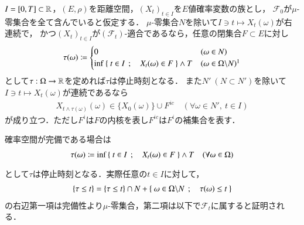	\begin{screen}
		\begin{thm}[閉集合と停止時刻]
			$I = [0,T] \subset \mathbb{R}$，$(E,\rho)$を距離空間，$(X_t)_{t \in I}$を$E$値確率変数の族とし，
			$\mathcal{F}_0$が$\mu$-零集合を全て含んでいると仮定する．
			$\mu$-零集合$N$を除いて$I \ni t \longmapsto X_t(\omega)$が右連続で，
			かつ$(X_t)_{t \in I}$が$(\mathcal{F}_t)$-適合であるなら，任意の閉集合$F \subset E$に対し
			\begin{align}
				\tau(\omega) \coloneqq
				\begin{cases}
					0 & (\omega \in N) \\
					\inf{}{\Set{t \in I}{X_t(\omega) \in F}} \wedge T & (\omega \in \Omega \backslash N) \footnotemark
				\end{cases}
			\end{align}
			として$\tau:\Omega \rightarrow \mathbb{R}$を定めれば$\tau$は停止時刻となる．
			また$N'\ (N \subset N')$を除いて$I \ni t \longmapsto X_t(\omega)$が連続であるなら
			\begin{align}
				X_{t \wedge \tau(\omega)}(\omega) \in \{ X_0(\omega) \} \cup F^{ic} \quad (\forall \omega \in N',\ t \in I)
			\end{align}
			が成り立つ．ただし$F^i$は$F$の内核を表し$F^{ic}$は$F^i$の補集合を表す．
			\label{thm:closed_set_stopping_time}
		\end{thm}
	\end{screen}
	確率空間が完備である場合は
	\begin{align}
		\tau(\omega) \coloneqq \operatorname*{inf}_{} \left\{\ t \in I\ \, ; \quad X_t(\omega) \in F\ \right\} \wedge T
		\quad (\forall \omega \in \Omega)
	\end{align}
	として$\tau$は停止時刻となる．実際任意の$t \in I$に対して，
	\begin{align}
		\{\tau \leq t\} = \{\tau \leq t\} \cap N + \left\{\ \omega \in \Omega \backslash N\ \, ; \quad \tau(\omega) \leq t\ \right\}
	\end{align}
	の右辺第一項は完備性より$\mu$-零集合，第二項は以下で$\mathcal{F}_t$に属すると証明される．


